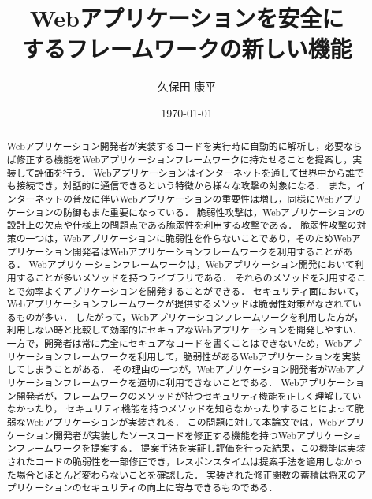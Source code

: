 \documentclass[a4paper,12pt]{jreport}
\title{Webアプリケーションを安全に\\するフレームワークの新しい機能}
\author{久保田 康平}
\date{\today}
\begin{document}
\maketitle

\begin{abstract}
Webアプリケーション開発者が実装するコードを実行時に自動的に解析し，必要ならば修正する機能をWebアプリケーションフレームワークに持たせることを提案し，実装して評価を行う．
Webアプリケーションはインターネットを通して世界中から誰でも接続でき，対話的に通信できるという特徴から様々な攻撃の対象になる．
また，インターネットの普及に伴いWebアプリケーションの重要性は増し，同様にWebアプリケーションの防御もまた重要になっている．
脆弱性攻撃は，Webアプリケーションの設計上の欠点や仕様上の問題点である脆弱性を利用する攻撃である．
脆弱性攻撃の対策の一つは，Webアプリケーションに脆弱性を作らないことであり，そのためWebアプリケーション開発者はWebアプリケーションフレームワークを利用することがある．
Webアプリケーションフレームワークは，Webアプリケーション開発において利用することが多いメソッドを持つライブラリである．
それらのメソッドを利用することで効率よくアプリケーションを開発することができる．
セキュリティ面において，Webアプリケーションフレームワークが提供するメソッドは脆弱性対策がなされているものが多い．
したがって，Webアプリケーションフレームワークを利用した方が，利用しない時と比較して効率的にセキュアなWebアプリケーションを開発しやすい．
一方で，開発者は常に完全にセキュアなコードを書くことはできないため，Webアプリケーションフレームワークを利用して，脆弱性があるWebアプリケーションを実装してしまうことがある．
その理由の一つが，Webアプリケーション開発者がWebアプリケーションフレームワークを適切に利用できないことである．
Webアプリケーション開発者が，フレームワークのメソッドが持つセキュリティ機能を正しく理解していなかったり，
セキュリティ機能を持つメソッドを知らなかったりすることによって脆弱なWebアプリケーションが実装される．
この問題に対して本論文では，Webアプリケーション開発者が実装したソースコードを修正する機能を持つWebアプリケーションフレームワークを提案する．
提案手法を実証し評価を行った結果，この機能は実装されたコードの脆弱性を一部修正でき，レスポンスタイムは提案手法を適用しなかった場合とほとんど変わらないことを確認した．
実装された修正関数の蓄積は将来のアプリケーションのセキュリティの向上に寄与できるものである．
\end{abstract}

\tableofcontents
\listoffigures
\listoftables
\newpage
{}
\end{document}
